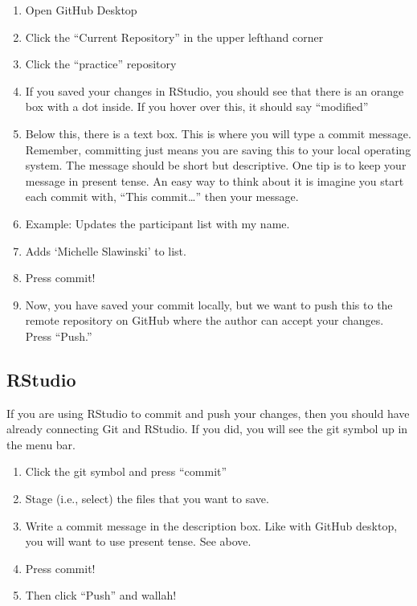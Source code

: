 \documentclass[
]{article}
\providecommand{\tightlist}{%
  \setlength{\itemsep}{0pt}\setlength{\parskip}{0pt}}
\begin{document}
\begin{enumerate}
\def\labelenumi{\arabic{enumi}.}
\tightlist
\item
  Open GitHub Desktop
\item
  Click the ``Current Repository'' in the upper lefthand corner
\item
  Click the ``practice'' repository
\item
  If you saved your changes in RStudio, you should see that there is an
  orange box with a dot inside. If you hover over this, it should say
  ``modified''
\item
  Below this, there is a text box. This is where you will type a commit
  message. Remember, committing just means you are saving this to your
  local operating system. The message should be short but descriptive.
  One tip is to keep your message in present tense. An easy way to think
  about it is imagine you start each commit with, ``This
  commit\ldots{}'' then your message.
\item
  Example: Updates the participant list with my name.
\item
  Adds `Michelle Slawinski' to list.
\item
  Press commit!
\item
  Now, you have saved your commit locally, but we want to push this to
  the remote repository on GitHub where the author can accept your
  changes. Press ``Push.''
\end{enumerate}

\hypertarget{rstudio}{%
\subsection{RStudio}\label{rstudio}}

If you are using RStudio to commit and push your changes, then you
should have already connecting Git and RStudio. If you did, you will see
the git symbol up in the menu bar.

\begin{enumerate}
\def\labelenumi{\arabic{enumi}.}
\tightlist
\item
  Click the git symbol and press ``commit''
\item
  Stage (i.e., select) the files that you want to save.
\item
  Write a commit message in the description box. Like with GitHub
  desktop, you will want to use present tense. See above.
\item
  Press commit!
\item
  Then click ``Push'' and wallah!
\end{enumerate}
\end{document}
